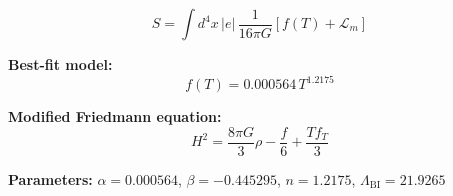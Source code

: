 
\begin{equation}
  S = \int d^4x \, |e| \, \frac{1}{16\pi G} \left[ f(T) + \mathcal{L}_m \right]
\end{equation}

\textbf{Best-fit model:}
\begin{equation}
  f(T) = 0.000564 \, T^{1.2175}
\end{equation}

\textbf{Modified Friedmann equation:}
\begin{equation}
  H^2 = \frac{8\pi G}{3} \rho - \frac{f}{6} + \frac{T f_T}{3}
\end{equation}

\textbf{Parameters:}
$\alpha = 0.000564$, \quad
$\beta = -0.445295$, \quad
$n = 1.2175$, \quad
$\Lambda_{\text{BI}} = 21.9265$